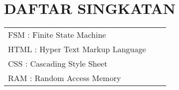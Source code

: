\chapter*{DAFTAR SINGKATAN}

\begin{table}
\begin{tabular}{l l l}
FSM : Finite State Machine\\
HTML : Hyper Text Markup Language\\
CSS : Cascading Style Sheet\\
RAM : Random Access Memory\\
\end{tabular}
\end{table}

